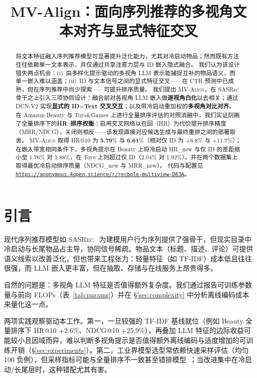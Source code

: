 \documentclass[sigconf,natbib=true,anonymous]{acmart}
\newcommand{\model}{\textsc{MV-Align}\xspace}
\newcommand{\base}{\textsc{SASRec}\xspace}
\newcommand{\tfidf}{\textsc{TF-IDF}\xspace}
\newcommand{\llm}{\textsc{LLM}\xspace}
\begin{document}
\title{MV-Align：面向序列推荐的多视角文本对齐与显式特征交叉}

\begin{abstract}
将文本特征融入序列推荐模型可显著提升泛化能力，尤其对冷启动物品；然而既有方法往往依赖单一文本表示，并仅通过共享注意力层与 ID 嵌入隐式融合。
我们认为该设计错失两点机会：(i)~由多样化提示驱动的多视角 \llm 表示能捕捉互补的物品语义，而单一嵌入难以涵盖；(ii)~ID 与文本信号之间的显式特征交叉——在 CTR 预测中已成熟，但在序列推荐中尚少探索——可提升排序质量。
%
我们提出 \model，在 \base 骨干之上引入三项协同设计：融合前对各视角 \llm 嵌入做\textbf{逐视角白化}以去相关；通过 DCN-V2 实现\textbf{显式的 ID$\times$Text 交叉交互}；以及带冷启动重加权的\textbf{多视角对比对齐}。
在 Amazon Beauty 与 Toys\&Games 上进行全量排序评估的对照消融中，我们实证刻画了全量排序下的\textbf{HR--排序权衡}：启用交叉网络以召回（HR）为代价提升排序精度（MRR/NDCG），关闭则相反——该发现直接对应候选生成与最终重排之间的部署取舍。
%
\model 取得 HR@10 为 \textbf{5.79}\% 与 \textbf{6.61}\%（相对仅 ID 为 +6.8\% 与 +11.7\%）；在嵌入带宽相同条件下，多视角提示在 Beauty 上将冷启动 HR\_new 与仅 ID 的差距缩小至 1.76\% 对 1.88\%，在 Toys 上则超过仅 ID（2.04\% 对 1.92\%），并在两个数据集上取得最优冷启动排序质量（NDCG\_new 与 MRR\_new）。
代码与配置见 \texttt{\url{https://anonymous.4open.science/r/recbole-multiview-D83A}}。
\end{abstract}


\maketitle

\section{引言}

现代序列推荐模型如 \base~\cite{kang2018sasrec} 为建模用户行为序列提供了强骨干，但现实目录中冷启动与长尾物品占主导，协同信号稀疏。物品文本（标题、描述、评论）可提供语义线索以改善泛化，但也带来工程张力：轻量特征（如 \tfidf）成本低且往往很强，而 \llm 嵌入更丰富，但在抽取、存储与在线服务上昂贵得多。

自然的问题是：多视角 \llm 特征是否值得额外复杂度。我们通过报告可训练参数量与前向 FLOPs（表~\ref{tab:params}）并在 \S\ref{sec:complexity} 中分析离线编码成本来量化这一点。

两项实践观察驱动本工作。第一，一旦较强的 \tfidf 基线就位（例如 Beauty 全量排序下 HR@10 +2.6\%、NDCG@10 +25.9\%），再叠加 \llm 特征的边际收益可能较小且因域而异，难以判断多视角提示是否值得额外离线编码与适度增加的可训练开销（\S\ref{sec:experiments}）。第二，工业界模型选型常依赖快速采样评估（均匀 100 负例），但采样指标可能与全量排序不一致甚至错排模型~\cite{krichene2020sampledmetrics}；当改进集中在冷启动/长尾层时，这种错配尤其有害。
\end{document}
